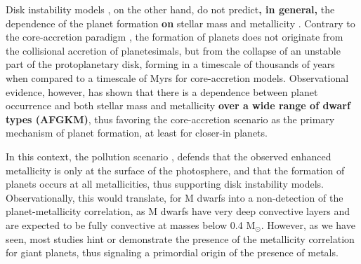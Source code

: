 \documentclass[structabstract]{aa}
\begin{document}







Disk instability models \citep[e.g.][]{Boss-1997}, on the other hand, do not predict\textbf{, in general,} the dependence of the planet formation \textbf{on} stellar mass \citep[e.g.][]{Boss-2006a} and metallicity \citep{Boss-2002}. %
Contrary to the core-accretion paradigm \citep{Pollack-1996}, the formation of planets does not originate from the collisional accretion of planetesimals, but from the collapse of an unstable part of the protoplanetary disk, forming in a timescale of thousands of years when compared to a timescale of Myrs for core-accretion models. Observational evidence, however, has shown that there is a dependence between planet occurrence and both stellar mass and metallicity \citep[e.g.][]{Santos-2004b,Bonfils-2007, Lovis-2007, Johnson-2007, Johnson-2010, Sousa-2011b, Mayor-2011} \textbf{over a wide range of dwarf types (AFGKM)}, thus favoring the core-accretion scenario as the primary mechanism of planet formation, at least for closer-in planets. 

In this context, the pollution scenario \citep[e.g.][]{Murray-2002,Gonzalez-1997}, defends that the observed enhanced metallicity is only at the surface of the photosphere, and that the formation of planets occurs at all metallicities, thus supporting disk instability models. Observationally, this would translate, for M dwarfs into a non-detection of the planet-metallicity correlation, as M dwarfs have very deep convective layers and are expected to be fully convective at masses below 0.4 M$_{\odot}$. However, as we have seen, most studies hint or demonstrate the presence of the metallicity correlation for giant planets, thus signaling a primordial origin of the presence of metals.
\end{document}
